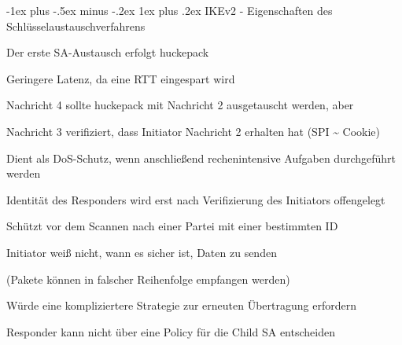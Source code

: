 \documentclass[a4paper]{article}
\makeatletter
\renewcommand{\subsubsection}{\@startsection{subsubsection}{3}{0mm}%
 {-1ex plus -.5ex minus -.2ex}%
 {1ex plus .2ex}%
 {\normalfont\small\bfseries}}
\makeatother
\begin{document}
\begin{multicols}{3}
\begin{itemize*}
            \subsubsection{IKEv2 - Eigenschaften des Schlüsselaustauschverfahrens}
            \begin{itemize*}
                  \item Der erste SA-Austausch erfolgt huckepack
                  \begin{itemize*}
                        \item Geringere Latenz, da eine RTT eingespart wird
                  \end{itemize*}
                  \item Nachricht 4 sollte huckepack mit Nachricht 2 ausgetauscht werden, aber
                  \begin{itemize*}
                        \item Nachricht 3 verifiziert, dass Initiator Nachricht 2 erhalten hat (SPI \textasciitilde{} Cookie)
                        \begin{itemize*}
                              \item Dient als DoS-Schutz, wenn anschließend rechenintensive Aufgaben durchgeführt werden
                        \end{itemize*}
                        \item Identität des Responders wird erst nach Verifizierung des Initiators offengelegt
                        \begin{itemize*}
                              \item Schützt vor dem Scannen nach einer Partei mit einer bestimmten ID
                        \end{itemize*}
                        \item Initiator weiß nicht, wann es sicher ist, Daten zu senden
                        \begin{itemize*}
                              \item (Pakete können in falscher Reihenfolge empfangen werden)
                        \end{itemize*}
                        \item Würde eine kompliziertere Strategie zur erneuten Übertragung erfordern
                        \item Responder kann nicht über eine Policy für die Child SA entscheiden
                  \end{itemize*}
            \end{itemize*}



\end{itemize*}
\end{multicols}
\end{document}
